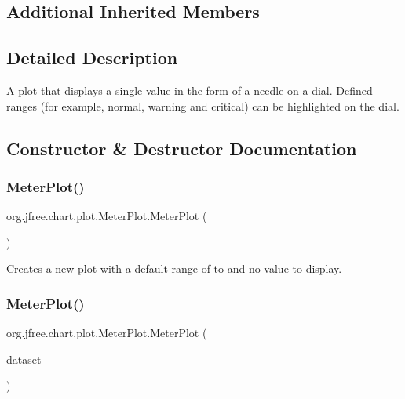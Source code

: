 \subsection*{Additional Inherited Members}


\subsection{Detailed Description}
A plot that displays a single value in the form of a needle on a dial. Defined ranges (for example, \textquotesingle{}normal\textquotesingle{}, \textquotesingle{}warning\textquotesingle{} and \textquotesingle{}critical\textquotesingle{}) can be highlighted on the dial. 

\subsection{Constructor \& Destructor Documentation}
\mbox{\label{classorg_1_1jfree_1_1chart_1_1plot_1_1_meter_plot_a4a0a29842ec472711756c9a88d8b7947}} 
\subsubsection{\texorpdfstring{Meter\+Plot()}{MeterPlot()}\hspace{0.1cm}{\footnotesize\ttfamily [1/2]}}
{\footnotesize\ttfamily org.\+jfree.\+chart.\+plot.\+Meter\+Plot.\+Meter\+Plot (\begin{DoxyParamCaption}{ }\end{DoxyParamCaption})}

Creates a new plot with a default range of {} to {} and no value to display. \mbox{\label{classorg_1_1jfree_1_1chart_1_1plot_1_1_meter_plot_a2330ceb78207a4218ee69ca939f20b29}} 
\subsubsection{\texorpdfstring{Meter\+Plot()}{MeterPlot()}\hspace{0.1cm}{\footnotesize\ttfamily [2/2]}}
{\footnotesize\ttfamily org.\+jfree.\+chart.\+plot.\+Meter\+Plot.\+Meter\+Plot (\begin{DoxyParamCaption}\item[{\mbox{\hyperlink{interfaceorg_1_1jfree_1_1data_1_1general_1_1_value_dataset}{Value\+Dataset}}}]{dataset }\end{DoxyParamCaption})}

